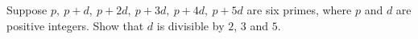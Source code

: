 Suppose $p,\ p+d,\ p+2d,\ p+3d,\ p+4d,\ p+5d$ are six primes, where $p$ and $d$ are positive integers. Show that $d$ is divisible by $2$, $3$ and $5$.

